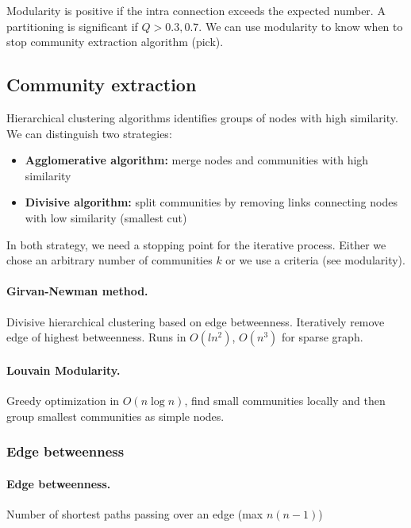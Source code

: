 Modularity is positive if the intra connection exceeds the expected number. A partitioning is significant if $Q>0.3,0.7$. We can use modularity to know when to stop community extraction algorithm (pick).

\subsection{Community extraction}


Hierarchical clustering algorithms identifies groups of nodes with high similarity. We can distinguish two strategies:

\begin{itemize}
  \item \textbf{Agglomerative algorithm:} merge nodes and communities with high similarity
  \item \textbf{Divisive algorithm:} split communities by removing links connecting nodes with low similarity (smallest cut)
\end{itemize}

In both strategy, we need a stopping point for the iterative process. Either we chose an arbitrary number of communities $k$ or we use a criteria (see modularity).

\paragraph{Girvan-Newman method.} Divisive hierarchical clustering based on edge betweenness. Iteratively remove edge of highest betweenness. Runs in $O(ln^2)$, $O(n^3)$ for sparse graph.

\paragraph{Louvain Modularity.} Greedy optimization in $O(n\log n)$, find small communities locally and then group smallest communities as simple nodes.

\subsubsection{Edge betweenness}

\paragraph{Edge betweenness.}
  Number of shortest paths passing over an edge (max $n(n-1)$)


